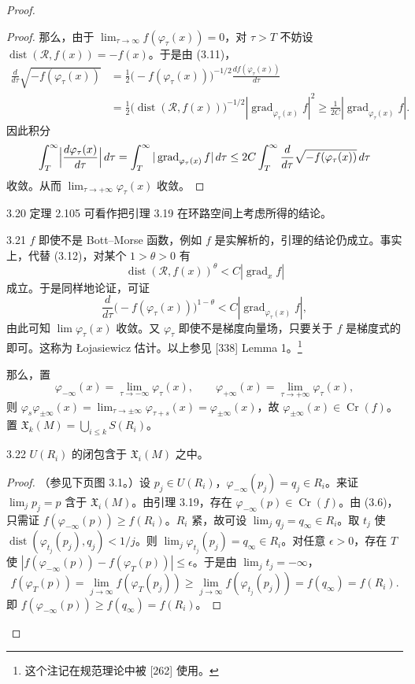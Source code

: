 \begin{proof}
\begin{proof}
  那么，由于 $\lim_{\tau\to\infty}f(\varphi_\tau(x))=0$，对 $\tau>T$ 不妨设 $\operatorname{dist}(\mathcal{R},f(x))=-f(x)$。于是由 (3.11)，
  \begin{align*}
    \frac{d}{d\tau}\sqrt{-f(\varphi_\tau(x))}
    &=\frac{1}{2}\bigl(-f(\varphi_\tau(x))\bigr)^{-1/2}\frac{df(\varphi_\tau(x))}{d\tau}\\
    &=\frac{1}{2}\bigl(\operatorname{dist}(\mathcal{R},f(x))\bigr)^{-1/2}|\operatorname{grad}_{\varphi_\tau(x)}f|^2
    \ge\frac{1}{2C}|\operatorname{grad}_{\varphi_\tau(x)}f|.
  \end{align*}
  因此积分
  \[
    \int_T^\infty\Bigl|\frac{d\varphi_\tau(x)}{d\tau}\Bigr|\,d\tau
    =\int_T^\infty|\operatorname{grad}_{\varphi_\tau(x)}f|\,d\tau
    \le 2C\int_T^\infty\frac{d}{d\tau}\sqrt{-f(\varphi_\tau(x))}\,d\tau
  \]
  收敛。从而 $\lim_{\tau\to+\infty}\varphi_\tau(x)$ 收敛。
\end{proof}

\begin{remark}{3.20}
  定理 2.105 可看作把引理 3.19 在环路空间上考虑所得的结论。
\end{remark}

\begin{remark}{3.21}
  $f$ 即使不是 Bott–Morse 函数，例如 $f$ 是实解析的，引理的结论仍成立。事实上，代替 (3.12)，对某个 $1>\theta>0$ 有
  \[
    \operatorname{dist}(\mathcal{R},f(x))^\theta<C|\operatorname{grad}_xf|
  \]
  成立。于是同样地论证，可证
  \[
    \frac{d}{d\tau}\bigl(-f(\varphi_\tau(x))\bigr)^{1-\theta}<C|\operatorname{grad}_{\varphi_\tau(x)}f|,
  \]
  由此可知 $\lim\varphi_\tau(x)$ 收敛。又 $\varphi_\tau$ 即使不是梯度向量场，只要关于 $f$ 是梯度式的即可。这称为 Łojasiewicz 估计。以上参见 [338] Lemma 1。\footnote{这个注记在规范理论中被 [262] 使用。}
\end{remark}

那么，置
\[
  \varphi_{-\infty}(x)=\lim_{\tau\to-\infty}\varphi_\tau(x),\qquad
  \varphi_{+\infty}(x)=\lim_{\tau\to+\infty}\varphi_\tau(x),
\]
则 $\varphi_s\varphi_{\pm\infty}(x)=\lim_{\tau\to\pm\infty}\varphi_{\tau+s}(x)=\varphi_{\pm\infty}(x)$，故 $\varphi_{\pm\infty}(x)\in\operatorname{Cr}(f)$。置 $\mathfrak{X}_k(M)=\bigcup_{i\le k}S(R_i)$。

\begin{lemma*}{3.22}
  $U(R_i)$ 的闭包含于 $\mathfrak{X}_i(M)$ 之中。
\end{lemma*}

\begin{proof}
  （参见下页图 3.1。）设 $p_j\in U(R_i)$，$\varphi_{-\infty}(p_j)=q_j\in R_i$。来证 $\lim_jp_j=p$ 含于 $\mathfrak{X}_i(M)$。由引理 3.19，存在 $\varphi_{-\infty}(p)\in\operatorname{Cr}(f)$。由 (3.6)，只需证 $f(\varphi_{-\infty}(p))\ge f(R_i)$。$R_i$ 紧，故可设 $\lim_jq_j=q_\infty\in R_i$。取 $t_j$ 使 $\operatorname{dist}(\varphi_{t_j}(p_j),q_j)<1/j$。则 $\lim_j\varphi_{t_j}(p_j)=q_\infty\in R_i$。对任意 $\epsilon>0$，存在 $T$ 使 $|f(\varphi_{-\infty}(p))-f(\varphi_T(p))|\le\epsilon$。于是由 $\lim_jt_j=-\infty$，
  \[
    f(\varphi_T(p))=\lim_{j\to\infty}f(\varphi_T(p_j))\ge\lim_{j\to\infty}f(\varphi_{t_j}(p_j))=f(q_\infty)=f(R_i).
  \]
  即 $f(\varphi_{-\infty}(p))\ge f(q_\infty)=f(R_i)$。
\end{proof}


\end{proof}
